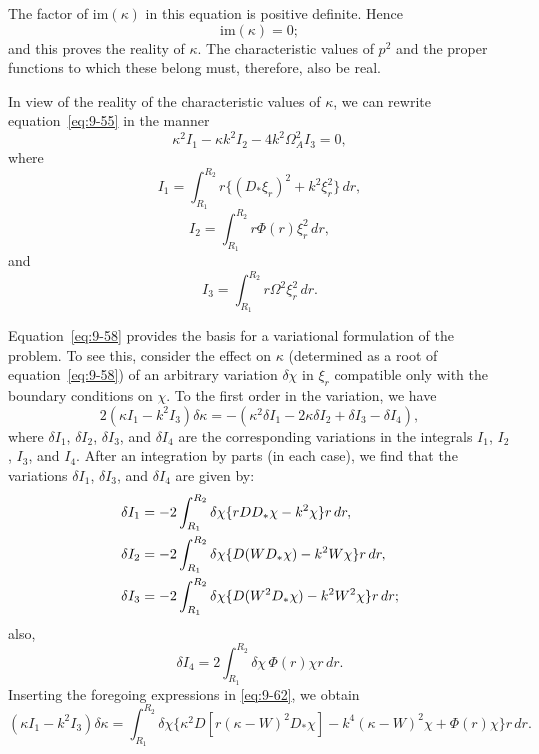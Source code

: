 The factor of $\mathrm{im}(\kappa)$ in this equation is positive definite. Hence
\begin{equation}
\mathrm{im}(\kappa) = 0; \label{eq:9-57}
\end{equation}
and this proves the reality of $\kappa$. The characteristic values of $p^2$ and the proper functions to which these belong must, therefore, also be real.

In view of the reality of the characteristic values of $\kappa$, we can rewrite equation~\eqref{eq:9-55} in the manner
\begin{equation}
\kappa^2 I_1 - \kappa k^2 I_2 - 4k^2 \Omega_A^2 I_3 = 0, \label{eq:9-58}
\end{equation}
where
\begin{equation}
I_1 = \int_{R_1}^{R_2} r\{(D_*\xi_r)^2 + k^2\xi_r^2\}\, dr, \label{eq:9-59}
\end{equation}
\begin{equation}
I_2 = \int_{R_1}^{R_2} r\Phi(r)\xi_r^2\, dr, \label{eq:9-60}
\end{equation}
and
\begin{equation}
I_3 = \int_{R_1}^{R_2} r\Omega^2\xi_r^2\, dr. \label{eq:9-61}
\end{equation}

Equation~\eqref{eq:9-58} provides the basis for a variational formulation of the problem. To see this, consider the effect on $\kappa$ (determined as a root of equation~\eqref{eq:9-58}) of an arbitrary variation $\delta\chi$ in $\xi_r$ compatible only with the boundary conditions on $\chi$. To the first order in the variation, we have
\begin{equation}
2(\kappa I_1 - k^2 I_3)\delta\kappa = -(\kappa^2 \delta I_1 - 2\kappa\delta I_2 + \delta I_3 - \delta I_4), \label{eq:9-62}
\end{equation}
where $\delta I_1$, $\delta I_2$, $\delta I_3$, and $\delta I_4$ are the corresponding variations in the integrals $I_1$, $I_2$, $I_3$, and $I_4$. After an integration by parts (in each case), we find that the variations $\delta I_1$, $\delta I_3$, and $\delta I_4$ are given by:
\begin{align}
\delta I_1 &= -2 \int_{R_1}^{R_2} \delta\chi\{rDD_*\chi - k^2\chi\}r\, dr, \notag \\
\delta I_2 &= -2 \int_{R_1}^{R_2} \delta\chi\{D(WD_*\chi) - k^2W\chi\}r\, dr, \label{eq:9-63} \\
\delta I_3 &= -2 \int_{R_1}^{R_2} \delta\chi\{D(W^2 D_*\chi) - k^2 W^2\chi\}r\, dr; \notag
\end{align}
also,
\begin{equation}
\delta I_4 = 2 \int_{R_1}^{R_2} \delta\chi\, \Phi(r)\chi r\, dr. \label{eq:9-64}
\end{equation}
Inserting the foregoing expressions in \eqref{eq:9-62}, we obtain
\begin{equation}
(\kappa I_1 - k^2 I_3)\delta\kappa = \int_{R_1}^{R_2} \delta\chi\{\kappa^2 D[r(\kappa - W)^2 D_*\chi] - k^4 (\kappa - W)^2 \chi + \Phi(r)\chi\}r\, dr. \label{eq:9-65}
\end{equation}

